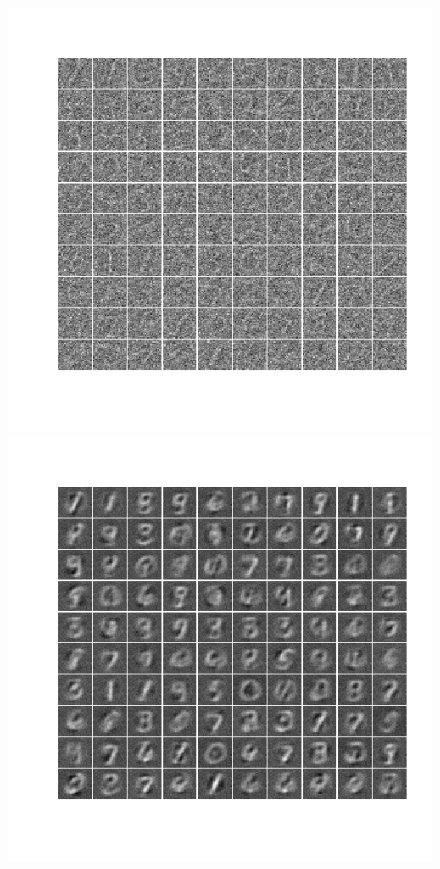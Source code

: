\documentclass{article}
\begin{document}
\begin{figure}\centering
\newcommand{\dns}{0.4}
	\includegraphics[scale=\dns]{noisy}
	\includegraphics[scale=\dns]{denoise8}

\end{figure}
\end{document}
